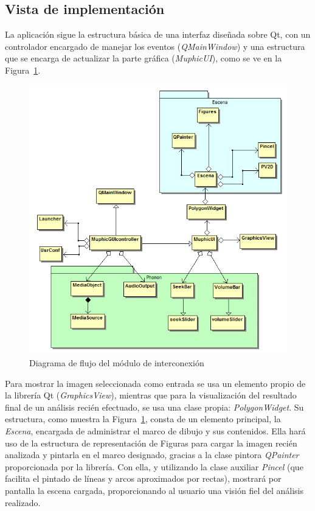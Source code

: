\subsection{Vista de implementación}

La aplicación sigue la estructura básica de una interfaz diseñada sobre Qt, con un controlador encargado de manejar los eventos (\emph{QMainWindow}) y una estructura que se encarga de actualizar la parte gráfica (\emph{MuphicUI}), como se ve en la Figura~\ref{fig:gui-class-diagram}.\\

		\begin{figure}[!htbp]
		\centering
		\includegraphics[scale=0.6]{graphics/gui_diagrama_clases.png}
		\caption{Diagrama de flujo del módulo de interconexión}
		\label{fig:gui-class-diagram}
		\end{figure}

Para mostrar la imagen seleccionada como entrada se usa un elemento propio de la librería Qt (\emph{GraphicsView}), mientras que para la visualización del resultado final de un análisis recién efectuado, se usa una clase propia: \emph{PolygonWidget}. Su estructura, como muestra la Figura~\ref{fig:gui-class-diagram}, consta de un elemento principal, la \emph{Escena}, encargada de administrar el marco de dibujo y sus contenidos. Ella hará uso de la estructura de representación de Figuras para cargar la imagen recién analizada y pintarla en el marco designado, gracias a la clase pintora \emph{QPainter} proporcionada por la librería. Con ella, y utilizando la clase auxiliar \emph{Pincel} (que facilita el pintado de líneas y arcos aproximados por rectas), mostrará por pantalla la escena cargada, proporcionando al usuario una visión fiel del análisis realizado.\\

